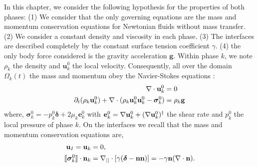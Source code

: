 In this chapter, we consider the following hypothesis for the properties of both phases:  
(1) We consider that the only governing equations are the mass and momentum conservation equations for Newtonian fluids without mass transfer. 
(2) We consider a constant density and viscosity in each phase. 
(3) The interfaces are described completely by the constant surface tension coefficient $\gamma$.
(4) the only body force considered is the gravity acceleration $\textbf{g}$. 
Within phase $k$, we note $\rho_k$ the density and $\textbf{u}_k^0$ the local velocity.
Consequently, all over the domain $\Omega_k(t)$ the mass and momentum obey the Navier-Stokes equations :
\begin{align}
    \mathbf{\nabla}\cdot 
        \textbf{u}_k^0
    &= 
    0\\
    \partial_t (\rho_k\textbf{u}_k^0)  
    + \mathbf{\nabla}\cdot (
        \rho_k\textbf{u}_k^0\textbf{u}_k^0
        - \bm{\sigma}_k^0 
    )
    &= 
    \rho_k \textbf{g}\\
\end{align} 
where, $\bm{\sigma}_k^0 = - p_k^0 \bm\delta + 2\mu_k \textbf{e}_k^0$ with $\textbf{e}_k^0 = \mathbf{\nabla} \textbf{u}_k^0 + (\mathbf{\nabla} \textbf{u}_k^0)^\dagger$ the shear rate and $p_k^0$ the local pressure of phase $k$. 
On the interfaces we recall that the mass and momentum conservation equations are,
\begin{align}
    \textbf{u}_I = \textbf{u}_k
    &=0, \\
    \llbracket \bm{\sigma}_k^0 \rrbracket \cdot \textbf{n}_k 
    &=
    \mathbf{\nabla}_{||}\cdot[\gamma(\bm\delta - \textbf{nn})]
    =
    - \gamma\textbf{n} (\mathbf{\nabla}\cdot \textbf{n}).
\end{align}

